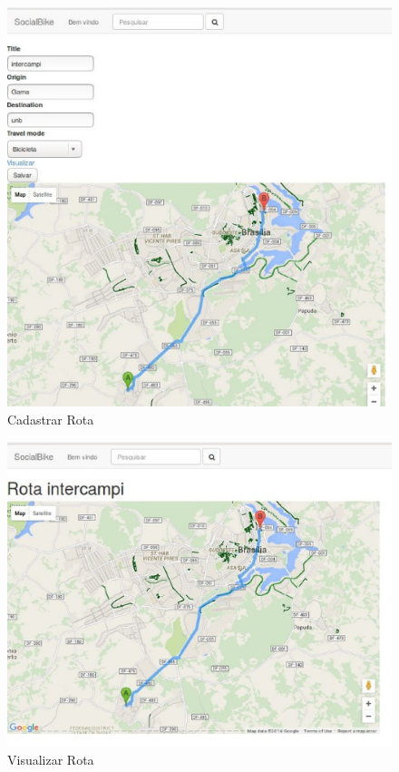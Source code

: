 \newpage
\begin{figure}[!h]
	\centering
	\includegraphics[scale=0.5]{figuras/resultados/cadastrar_rota.eps}
	\caption[Cadastrar Rota]{Cadastrar Rota}
	\label{cadastrar_rota}
\end{figure}

\begin{figure}[!h]
	\centering
	\includegraphics[scale=0.5]{figuras/resultados/ver_rota.eps}
	\caption[Visualizar Rota]{Visualizar Rota}
	\label{ver_rota}
\end{figure}

